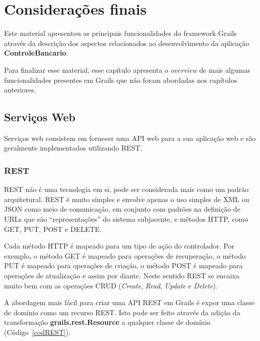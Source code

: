 \chapter{Considerações finais}\label{conclusoes}

Este  material  apresentou as  principais  funcionalidades  do framework  Grails
através da  descrição dos aspectos relacionados ao  desenvolvimento da aplicação
{\bf ControleBancario}.

\vspace{0.2cm}
\noindent Para finalizar esse material, esse capítulo apresenta o {\it overview}
de mais algumas funcionalidades presentes  em Grails que não foram abordadas nos
capítulos anteriores.

\section{Serviços Web}

\vspace{0.5cm}

Serviços web consistem  em fornecer uma API  web para a sua aplicação  web e são
geralmente implementados utilizando REST.

\subsection{REST}

\vspace{0.5cm}

REST  não é  uma tecnologia  em si,  pode ser  considerada mais  como  um padrão
arquitetural. REST é muito simples e envolve apenas o uso simples de XML ou JSON
como meio de  comunicação, em conjunto com padrões na definição  de URLs que são
``representações'' do sistema subjacente, e  métodos HTTP, como GET, PUT, POST e
DELETE.

\vspace{0.2cm}

Cada método HTTP é  mapeado para um tipo de ação do  controlador. Por exemplo, o
método GET é mapeado para operações  de recuperação, o método PUT é mapeado para
operações de criação, o método POST é mapeado para operações de atualização e
assim por diante. Neste sentido REST  se encaixa muito bem com as operações CRUD
({\it Create}, {\it Read}, {\it Update} e {\it Delete}).

\vspace{0.2cm}

A abordagem mais fácil  para criar uma API REST em Grails  é expor uma classe de
domínio  como  um recurso  REST.   Isto  pode ser  feito  através  da adição  da
transformação   {\bf  grails.rest.Resource}   a  qualquer   classe   de  domínio
(Código~\ref{codREST}). 

